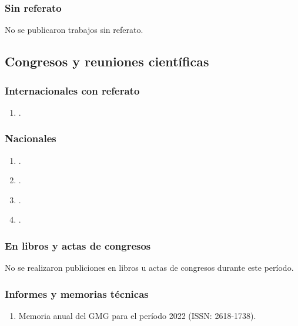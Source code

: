 \documentclass[a4paper,11pt,twoside,final,titlepage,onecolumn,openright]{report}
\begin{document}
\subsubsection{Sin referato}
No se publicaron trabajos sin referato.

\subsection{Congresos y reuniones científicas} 

\subsubsection{Internacionales con referato}
\begin{enumerate}
    \item {}.
\end{enumerate}

\subsubsection{Nacionales}

\begin{enumerate}
    \item {}.
    \item {}.
    \item {}.
    \item {}.
\end{enumerate}

\subsubsection{En libros y actas de congresos}

No se realizaron publiciones en libros u actas de congresos durante este período.

\subsubsection{Informes y memorias técnicas}
\begin{enumerate}
 \item Memoria anual del GMG para el período 2022 (ISSN: 2618-1738).
\end{enumerate}
\vspace{0.25cm}
\end{document}
